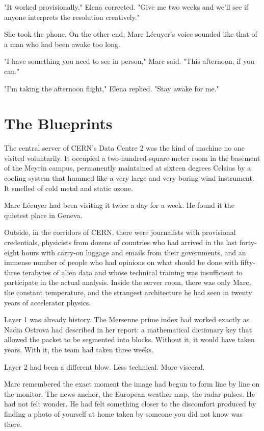 \documentclass[11pt,a5paper,twoside]{book}
\begin{document}
"It worked provisionally," Elena corrected. "Give me two weeks and we'll see if anyone interprets the resolution creatively."

She took the phone. On the other end, Marc Lécuyer's voice sounded like that of a man who had been awake too long.

"I have something you need to see in person," Marc said. "This afternoon, if you can."

"I'm taking the afternoon flight," Elena replied. "Stay awake for me."

\chapter{The Blueprints}

The central server of CERN's Data Centre 2 was the kind of machine no one visited voluntarily. It occupied a two-hundred-square-meter room in the basement of the Meyrin campus, permanently maintained at sixteen degrees Celsius by a cooling system that hummed like a very large and very boring wind instrument. It smelled of cold metal and static ozone.

Marc Lécuyer had been visiting it twice a day for a week. He found it the quietest place in Geneva.

Outside, in the corridors of CERN, there were journalists with provisional credentials, physicists from dozens of countries who had arrived in the last forty-eight hours with carry-on luggage and emails from their governments, and an immense number of people who had opinions on what should be done with fifty-three terabytes of alien data and whose technical training was insufficient to participate in the actual analysis. Inside the server room, there was only Marc, the constant temperature, and the strangest architecture he had seen in twenty years of accelerator physics.

Layer 1 was already history. The Mersenne prime index had worked exactly as Nadia Ostrova had described in her report: a mathematical dictionary key that allowed the packet to be segmented into blocks. Without it, it would have taken years. With it, the team had taken three weeks.

Layer 2 had been a different blow. Less technical. More visceral.

Marc remembered the exact moment the image had begun to form line by line on the monitor. The news anchor, the European weather map, the radar pulses. He had not felt wonder. He had felt something closer to the discomfort produced by finding a photo of yourself at home taken by someone you did not know was there.
\end{document}
